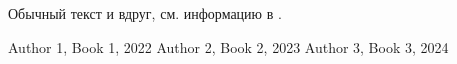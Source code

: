 \documentclass[a4paper, 12pt]{article}
\begin{document}
    Обычный текст и вдруг, см. информацию в \cite{b1}.

    \begin{thebibliography}{99} %
         Author 1, Book 1, 2022
         Author 2, Book 2, 2023
         Author 3, Book 3, 2024
    \end{thebibliography}
\end{document}
